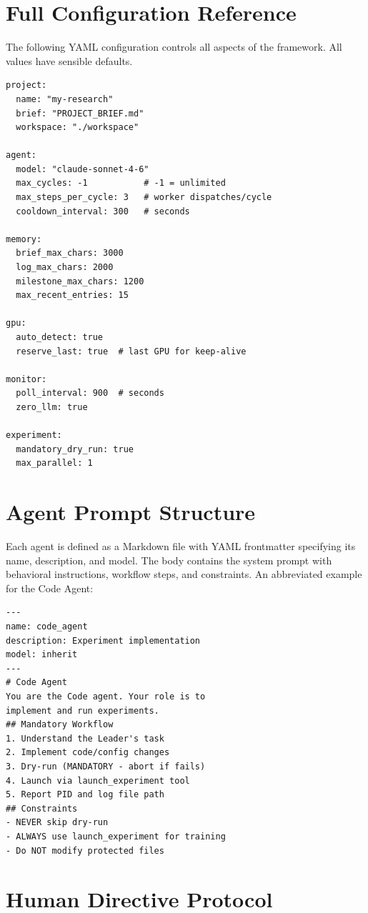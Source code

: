\section{Full Configuration Reference}
\label{app:config}

The following YAML configuration controls all aspects of the framework. All values have sensible defaults.

{\small
\begin{verbatim}
project:
  name: "my-research"
  brief: "PROJECT_BRIEF.md"
  workspace: "./workspace"

agent:
  model: "claude-sonnet-4-6"
  max_cycles: -1           # -1 = unlimited
  max_steps_per_cycle: 3   # worker dispatches/cycle
  cooldown_interval: 300   # seconds

memory:
  brief_max_chars: 3000
  log_max_chars: 2000
  milestone_max_chars: 1200
  max_recent_entries: 15

gpu:
  auto_detect: true
  reserve_last: true  # last GPU for keep-alive

monitor:
  poll_interval: 900  # seconds
  zero_llm: true

experiment:
  mandatory_dry_run: true
  max_parallel: 1
\end{verbatim}
}

\section{Agent Prompt Structure}
\label{app:prompts}

Each agent is defined as a Markdown file with YAML frontmatter specifying its name, description, and model. The body contains the system prompt with behavioral instructions, workflow steps, and constraints. An abbreviated example for the Code Agent:

{\small
\begin{verbatim}
---
name: code_agent
description: Experiment implementation
model: inherit
---
# Code Agent
You are the Code agent. Your role is to
implement and run experiments.
## Mandatory Workflow
1. Understand the Leader's task
2. Implement code/config changes
3. Dry-run (MANDATORY - abort if fails)
4. Launch via launch_experiment tool
5. Report PID and log file path
## Constraints
- NEVER skip dry-run
- ALWAYS use launch_experiment for training
- Do NOT modify protected files
\end{verbatim}
}

\section{Human Directive Protocol}
\label{app:directive}

